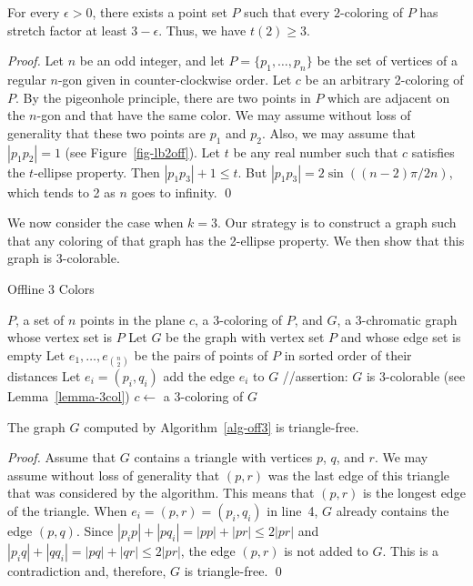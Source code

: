 \documentclass[pdftex,leqno,fleqn,12pts]{llncs}
\begin{document}
\begin{lemma}\label{prop-lb2off} 
For every $\epsilon>0$, there exists a point set $P$ such that every
$2$-coloring of $P$ has stretch factor at least $3-\epsilon$. 
Thus, we have $t(2)\geq 3$.
\end{lemma}
\begin{proof} 
Let $n$ be an odd integer, and let $P=\{p_1,\ldots,p_n\}$ be the set of 
vertices of a regular $n$-gon given in counter-clockwise order. 
Let $c$ be an arbitrary 2-coloring of $P$. By the pigeonhole principle, 
there are two points in $P$ which are adjacent on the $n$-gon and 
that have the same color. We may assume without loss of generality 
that these two points are $p_1$ and $p_2$. Also, we may assume that 
$|p_1 p_2|=1$ (see Figure~\ref{fig-lb2off}).
Let $t$ be any real number such that $c$ satisfies the $t$-ellipse 
property. Then $|p_1p_3|+1\leq t$. But $|p_1p_3|=2\sin((n-2)\pi/2n)$, 
which tends to 2 as $n$ goes to infinity.
\qed 
\end{proof}

We now consider the case when $k=3$. Our strategy is to construct a 
graph such that any coloring of that graph has the 2-ellipse property. 
We then show that this graph is 3-colorable.

\begin{algorithm}
\caption{Offline 3 Colors}\label{alg-off3}
\begin{algorithmic}[1]
\REQUIRE $P$, a set of $n$ points in the plane
\ENSURE $c$, a 3-coloring of $P$, and $G$, a 3-chromatic graph whose 
vertex set is $P$
\STATE Let $G$ be the graph with vertex set $P$ and whose edge set 
is empty
\STATE Let $e_1,\ldots,e_{\binom{n}{2}}$ be the pairs of points of
$P$ in sorted order of their distances 
\STATE Let $e_i=(p_i,q_i)$
\label{addrule}
\STATE add the edge $e_i$ to $G$
\ENDIF
\ENDFOR
\STATE //assertion: $G$ is 3-colorable (see Lemma~\ref{lemma-3col})
\label{line-assert-3col}
\STATE $c\leftarrow$ a 3-coloring of $G$
\end{algorithmic}
\end{algorithm}





\begin{lemma}   \label{lemma-triangle-free} 
The graph $G$ computed by Algorithm~\ref{alg-off3} is triangle-free.
\end{lemma}
\begin{proof}
Assume that $G$ contains a triangle with vertices $p$, $q$, and $r$. 
We may assume without loss of generality that $(p,r)$ was the last 
edge of this triangle that was considered by the algorithm. This means that $(p,r)$ is the longest edge of the triangle. 
When $e_i=(p,r)=(p_i,q_i)$ in line~4, $G$ already contains the
edge $(p,q)$. Since $|p_ip|+|pq_i|=|pp|+|pr|\leq 2|pr|$ and
$|p_iq|+|qq_i|=|pq|+|qr|\leq 2|pr|$,
the edge $(p,r)$ is not added to $G$. This is a contradiction and, 
therefore, $G$ is triangle-free.
\qed 
\end{proof}
\end{document}
